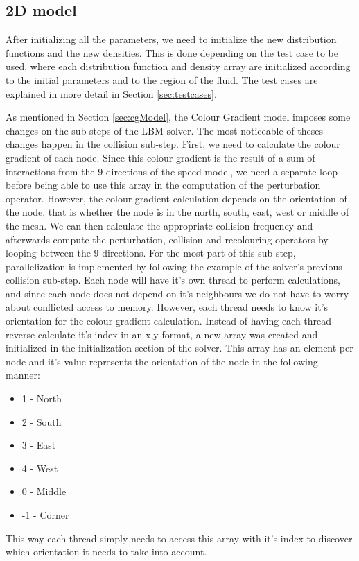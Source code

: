 \documentclass[12pt, openany]{book}
\begin{document}
\subsection{2D model}
After initializing all the parameters, we need to initialize the new distribution functions and the new densities. This is done depending on the test case to be used, where each distribution function and density array are initialized according to the initial parameters and to the region of the fluid. The test cases are explained in more detail in Section \ref{sec:testcases}. \par
As mentioned in Section \ref{sec:cgModel}, the Colour Gradient model imposes some changes on the sub-steps of the LBM solver. The most noticeable of theses changes happen in the collision sub-step. First, we need to calculate the colour gradient of each node. Since this colour gradient is the result of a sum of interactions from the 9 directions of the speed model, we need a separate loop before being able to use this array in the computation of the perturbation operator. However, the colour gradient calculation depends on the orientation of the node, that is whether the node is in the north, south, east, west or middle of the mesh. We can then calculate the appropriate collision frequency and afterwards compute the perturbation, collision and recolouring operators by looping between the 9 directions. For the most part of this sub-step, parallelization is implemented by following the example of the solver's previous collision sub-step. Each node will have it's own thread to perform calculations, and since each node does not depend on it's neighbours we do not have to worry about conflicted access to memory. However, each thread needs to know it's orientation for the colour gradient calculation. Instead of having each thread reverse calculate it's index in an x,y format, a new array was created and initialized in the initialization section of the solver. This array has an element per node and it's value represents the orientation of the node in the following manner:
\begin{itemize}
	\item 1 - North
	\item 2 - South 
	\item 3 - East 
	\item 4 - West 
	\item 0 - Middle
	\item -1 - Corner    
\end{itemize}
This way each thread simply needs to access this array with it's index to discover which orientation it needs to take into account. \par
\end{document}
